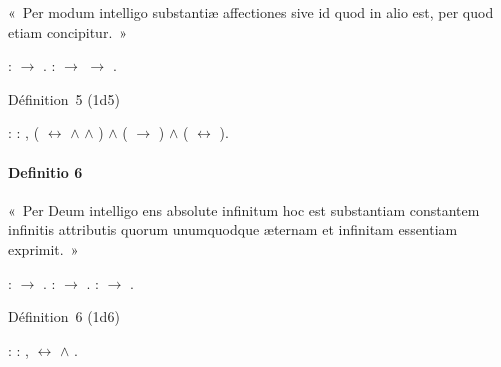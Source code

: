 \documentclass[12pt]{report}
\begin{document}
 « Per modum intelligo substantiæ affectiones sive id quod in alio
  est, per quod etiam concipitur. » \begin{coqdoccode}
\coqdocemptyline
\coqdocindent{1.00em}
 :  \ensuremath{\rightarrow} .\coqdoceol
\coqdocindent{1.00em}
 :  \ensuremath{\rightarrow}  \ensuremath{\rightarrow} .\coqdoceol
\coqdocemptyline
\coqdocemptyline
\coqdocemptyline
\end{coqdoccode}
Définition 5 (1d5) \begin{coqdoccode}
\coqdocindent{1.00em}
 :\coqdoceol
\coqdocindent{2.00em}
\coqdockw{\ensuremath{\forall}}  : ,\coqdoceol
\coqdocindent{3.00em}
(   \coqdoceol
\coqdocindent{3.50em}
\ensuremath{\leftrightarrow} \coqdoceol
\coqdocindent{3.50em}
  \ensuremath{\land}   \ensuremath{\land}   )\coqdoceol
\coqdocindent{3.00em}
\ensuremath{\land}\coqdoceol
\coqdocindent{3.00em}
(   \ensuremath{\rightarrow}   )\coqdoceol
\coqdocindent{3.00em}
\ensuremath{\land}\coqdoceol
\coqdocindent{3.00em}
(  \ensuremath{\leftrightarrow}  ).\coqdoceol
\coqdocemptyline
\coqdocemptyline
\coqdocemptyline
\coqdocemptyline
\coqdocemptyline
\end{coqdoccode}
\paragraph{Definitio 6}

 « Per Deum intelligo ens absolute infinitum hoc est substantiam
  constantem infinitis attributis quorum unumquodque æternam et
  infinitam essentiam exprimit. » \begin{coqdoccode}
\coqdocemptyline
\coqdocindent{1.00em}
 :  \ensuremath{\rightarrow} .\coqdoceol
\coqdocindent{1.00em}
 :  \ensuremath{\rightarrow} .\coqdoceol
\coqdocindent{1.00em}
 :  \ensuremath{\rightarrow} .\coqdoceol
\coqdocemptyline
\end{coqdoccode}
Définition 6 (1d6) \begin{coqdoccode}
\coqdocindent{1.00em}
 :\coqdoceol
\coqdocindent{2.00em}
\coqdockw{\ensuremath{\forall}} : ,\coqdoceol
\coqdocindent{3.00em}
  \coqdoceol
\coqdocindent{3.00em}
\ensuremath{\leftrightarrow}   \ensuremath{\land}  .\coqdoceol
\coqdocemptyline
\end{coqdoccode}
\end{document}
